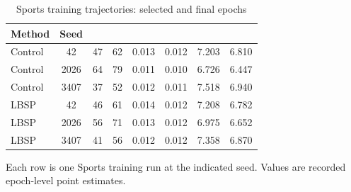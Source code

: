 \begin{table}[!htbp]
\centering
\caption{Sports training trajectories: selected and final epochs}
\label{tab:x7-training}
\fontsize{8.5}{11}\selectfont
\setlength{\tabcolsep}{1.6pt}
\renewcommand{\arraystretch}{1.15}
\begin{tabular*}{\textwidth}{@{\extracolsep{\fill}}lS[table-format=4.0]S[table-format=2.0]S[table-format=2.0]S[table-format=1.3]S[table-format=1.3]S[table-format=1.3]S[table-format=1.3]@{}}
\toprule
Method & {Seed} & {} & {} & {} & {} & {} & {}\\
\midrule
Control & 42 & 47 & 62 & 0.013 & 0.012 & 7.203 & 6.810\\ %
Control & 2026 & 64 & 79 & 0.011 & 0.010 & 6.726 & 6.447\\ %
Control & 3407 & 37 & 52 & 0.012 & 0.011 & 7.518 & 6.940\\ %
\midrule
LBSP & 42 & 46 & 61 & 0.014 & 0.012 & 7.208 & 6.782\\ %
LBSP & 2026 & 56 & 71 & 0.013 & 0.012 & 6.975 & 6.652\\ %
LBSP & 3407 & 41 & 56 & 0.012 & 0.012 & 7.358 & 6.870\\ %
\bottomrule
\end{tabular*}
\par\smallskip\noindent\begin{minipage}{\textwidth}\fontsize{8.5}{11}\selectfont Each row is one Sports training run at the indicated seed. Values are recorded epoch-level point estimates.
\end{minipage}
\end{table}
